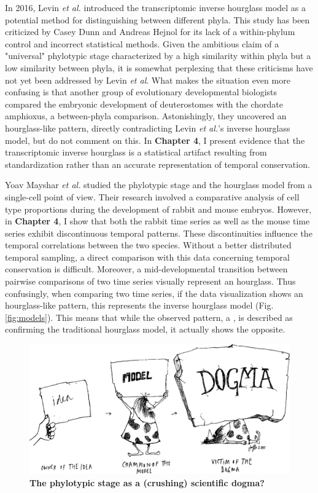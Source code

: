 In 2016, Levin \textit{et al.} introduced the transcriptomic inverse hourglass model as a potential method for distinguishing between different phyla\cite{Levin2016}. This study has been criticized by Casey Dunn and Andreas Hejnol for its lack of a within-phylum control\cite{hejnol2016} and incorrect statistical methods\cite{Dunn2018}. Given the ambitious claim of a "universal" phylotypic stage characterized by a high similarity within phyla but a low similarity between phyla, it is somewhat perplexing that these criticisms have not yet been addressed by Levin \textit{et al}. What makes the situation even more confusing is that another group of evolutionary developmental biologists compared the embryonic development of deuterostomes with the chordate amphioxus, a between-phyla comparison. Astonishingly, they uncovered an hourglass-like pattern\cite{PerezPosada2022}, directly contradicting Levin \textit{et al.}'s inverse hourglass model, but do not comment on this. In \textbf{Chapter 4}, I present evidence that the transcriptomic inverse hourglass is a statistical artifact resulting from standardization rather than an accurate representation of temporal conservation. 

Yoav Mayshar \textit{et al.} studied the phylotypic stage and the hourglass model from a single-cell point of view\cite{Mayshar2023}. Their research involved a comparative analysis of cell type proportions during the development of rabbit and mouse embryos. However, in \textbf{Chapter 4}, I show that both the rabbit time series as well as the mouse time series exhibit discontinuous temporal patterns. These discontinuities influence the temporal correlations between the two species. Without a better distributed temporal sampling, a direct comparison with this data concerning temporal conservation is difficult. Moreover, a mid-developmental transition between pairwise comparisons of two time series visually represent an hourglass. Thus confusingly, when comparing two time series, if the data visualization shows an hourglass-like pattern, this represents the inverse hourglass model (Fig. \ref{fig:models}). This means that while the observed pattern, a , is described as confirming the traditional hourglass model, it actually shows the opposite. 

\begin{figure}
    \includegraphics[width=\linewidth]{ch.discussion/imgs/dogma.png}
    \caption{\textbf{The phylotypic stage as a (crushing) scientific dogma?} \cite{Caveman2000}}
    \label{fig:dogma}
\end{figure}

